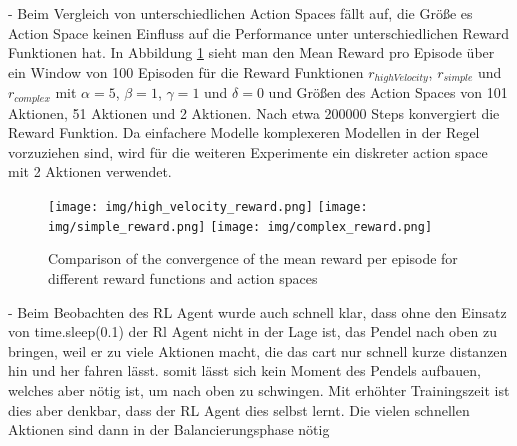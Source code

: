 - Beim Vergleich von unterschiedlichen Action Spaces fällt auf, die Größe es Action Space keinen Einfluss auf die Performance unter unterschiedlichen Reward Funktionen hat. In Abbildung \ref{fig:action_space_comparison} sieht man den Mean Reward pro Episode über ein Window von 100 Episoden für die Reward Funktionen $r_{highVelocity}$, $r_{simple}$ und $r_{complex}$ mit $\alpha=5$, $\beta=1$, $\gamma=1$ und $\delta=0$ und Größen des Action Spaces von 101 Aktionen, 51 Aktionen und 2 Aktionen. Nach etwa 200000 Steps konvergiert die Reward Funktion. Da einfachere Modelle komplexeren Modellen in der Regel vorzuziehen sind, wird für die weiteren Experimente ein diskreter action space mit 2 Aktionen verwendet.
\begin{figure}[htbp]
    \centering
    \texttt{[image: img/high\_velocity\_reward.png]}
    \texttt{[image: img/simple\_reward.png]}
    \texttt{[image: img/complex\_reward.png]}
    \caption{Comparison of the convergence of the mean reward per episode for different reward functions and action spaces}
    \label{fig:action_space_comparison}
\end{figure}
- Beim Beobachten des RL Agent wurde auch schnell klar, dass ohne den Einsatz von time.sleep(0.1) der Rl Agent nicht in der Lage ist, das Pendel nach oben zu bringen, weil er zu viele Aktionen macht, die das cart nur schnell kurze distanzen hin und her fahren lässt. somit lässt sich kein Moment des Pendels aufbauen, welches aber nötig ist, um nach oben zu schwingen. Mit erhöhter Trainingszeit ist dies aber denkbar, dass der RL Agent dies selbst lernt. Die vielen schnellen Aktionen sind dann in der Balancierungsphase nötig

